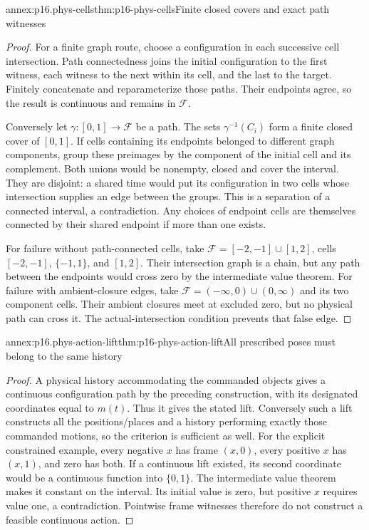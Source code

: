 \begin{annexitem}{annex:p16.phys-cells}{thm:p16-phys-cells}{Finite closed covers and exact path witnesses}
\begin{proof}
For a finite graph route, choose a configuration in each successive cell
intersection. Path connectedness joins the initial configuration to the
first witness, each witness to the next within its cell, and the last to
the target. Finitely concatenate and reparameterize those paths. Their
endpoints agree, so the result is continuous and remains in \(\mathcal F\).

Conversely let \(\gamma:[0,1]\to\mathcal F\) be a path. The sets
\(\gamma^{-1}(C_i)\) form a finite closed cover of \([0,1]\).
If cells containing its endpoints belonged to different graph components,
group these preimages by the component of the initial cell and its
complement. Both unions would be nonempty, closed and cover the interval.
They are disjoint: a shared time would put its configuration in two cells
whose intersection supplies an edge between the groups. This is a separation
of a connected interval, a contradiction. Any choices of endpoint cells
are themselves connected by their shared endpoint if more than one exists.

For failure without path-connected cells, take
\(\mathcal F=[-2,-1]\cup[1,2]\), cells \([-2,-1]\),
\(\{-1,1\}\), and \([1,2]\). Their intersection graph is a chain,
but any path between the endpoints would cross zero by the intermediate
value theorem. For failure with ambient-closure edges, take
\(\mathcal F=(-\infty,0)\cup(0,\infty)\) and its two component
cells. Their ambient closures meet at excluded zero, but no physical path
can cross it. The actual-intersection condition prevents that false edge.
\end{proof}
\end{annexitem}

\begin{annexitem}{annex:p16.phys-action-lift}{thm:p16-phys-action-lift}{All prescribed poses must belong to the same history}
\begin{proof}
A physical history accommodating the commanded objects gives a continuous
configuration path by the preceding construction, with its designated
coordinates equal to \(m(t)\). Thus it gives the stated lift. Conversely
such a lift constructs all the positions/places and a history performing
exactly those commanded motions, so the criterion is sufficient as well.
For the explicit constrained example, every negative \(x\) has frame
\((x,0)\), every positive \(x\) has \((x,1)\), and zero has both.
If a continuous lift existed, its second coordinate would be a continuous
function into \(\{0,1\}\). The intermediate value theorem makes it
constant on the interval. Its initial value is zero, but positive \(x\)
requires value one, a contradiction. Pointwise frame witnesses therefore
do not construct a feasible continuous action.
\end{proof}
\end{annexitem}

